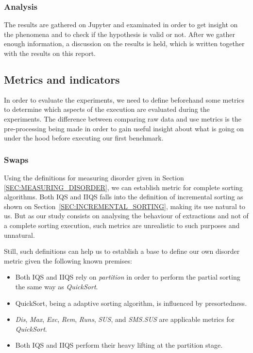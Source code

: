 \subsubsection{Analysis}
The results are gathered on Jupyter and examinated in order to get insight on the phenomena and to check if the hypothesis is valid or not. After we gather enough information, a discussion on the results is held, which is written together with the results on this report.

\subsection{Metrics and indicators}
In order to evaluate the experiments, we need to define beforehand some metrics to determine which aspects of the execution are evaluated during the experiments. The difference between comparing raw data and use metrics is the pre-processing being made in order to gain useful insight about what is going on under the hood before executing our first benchmark.

\subsubsection{Swaps}
Using the definitions for measuring disorder given in Section \ref{SEC:MEASURING_DISORDER}, we can establish metric for complete sorting algorithms. Both IQS and IIQS falls into the definition of incremental sorting as shown on Section~\ref{SEC:INCREMENTAL_SORTING}, making its use natural to us. But as our study consists on analysing the behaviour of extractions and not of a complete sorting execution, such metrics are unrealistic to such purposes and unnatural.

Still, such definitions can help us to establish a base to define our own disorder metric given the following known premises:

\begin{itemize}
    \item Both IQS and IIQS rely on \textit{partition} in order to perform the partial sorting the same way as \textit{QuickSort}.
    \item QuickSort, being a adaptive sorting algorithm, is influenced by presortedness.
    \item \textit{Dis}, \textit{Max}, \textit{Exc}, \textit{Rem}, \textit{Runs}, \textit{SUS}, and \textit{SMS.SUS} are applicable metrics for \textit{QuickSort}.
    \item Both IQS and IIQS perform their heavy lifting at the partition stage.
\end{itemize}

